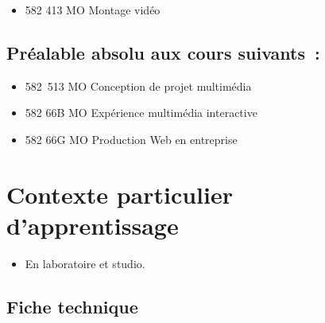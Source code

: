 \documentclass[
]{book}
\providecommand{\tightlist}{%
  \setlength{\itemsep}{0pt}\setlength{\parskip}{0pt}}
\begin{document}
\begin{itemize}
\tightlist
\item
  582 413 MO Montage vidéo
\end{itemize}

\hypertarget{pruxe9alable-absolu-aux-cours-suivants}{%
\subsection{Préalable absolu aux cours suivants~:}\label{pruxe9alable-absolu-aux-cours-suivants}}

\begin{itemize}
\tightlist
\item
  582~513 MO Conception de projet multimédia
\item
  582 66B MO Expérience multimédia interactive
\item
  582 66G MO Production Web en entreprise
\end{itemize}

\hypertarget{contexte-particulier-dapprentissage}{%
\section{Contexte particulier d'apprentissage}\label{contexte-particulier-dapprentissage}}

\begin{itemize}
\tightlist
\item
  En laboratoire et studio.
\end{itemize}

\hypertarget{fiche-technique}{%
\subsection{Fiche technique}\label{fiche-technique}}
\end{document}
